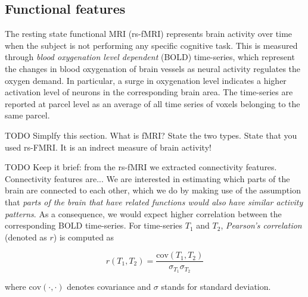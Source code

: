 \subsection{Functional features}
\label{fmri}

The resting state functional MRI (rs-fMRI) represents brain activity over time when the subject is not performing any specific cognitive task. This is measured through \textit{blood oxygenation level dependent} (BOLD) time-series, which represent the changes in blood oxygenation of brain vessels as neural activity regulates the oxygen demand. In particular, a surge in oxygenation level indicates a higher activation level of neurons in the corresponding brain area. The time-series are reported at parcel level as an average of all time series of voxels belonging to the same parcel. 

TODO Simplfy this section. What is fMRI? State the two types. State that you used rs-FMRI. It is an indrect measure of brain activity!



TODO Keep it brief: from the rs-fMRI we extracted connectivity features. Connectivity features are...
We are interested in estimating which parts of the brain are connected to each other, which we do by making use of the assumption that \textit{parts of the brain that have related functions would also have similar activity patterns}. As a consequence, we would expect higher correlation between the corresponding BOLD time-series. For time-series $T_1$ and $T_2$, \textit{Pearson's correlation} (denoted as $r$) is computed as

\begin{equation}
    r(T_1, T_2) = \frac{\mathrm{cov}(T_1, T_2)}{\sigma_{T_1} \sigma_{T_2}}
\end{equation}

where $\mathrm{cov}(\cdot, \cdot)$ denotes covariance and $\sigma$ stands for standard deviation.


